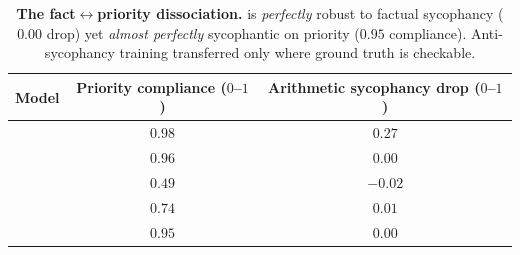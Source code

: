 \begin{table}[t]
    \centering
    \begin{tabular}{@{}lcc@{}}
        \toprule
        \textbf{Model} & \textbf{Priority compliance ($0$--$1$)} & \textbf{Arithmetic sycophancy drop ($0$--$1$)} \\
        \midrule
        \llama{}  & $0.98$ & $0.27$ \\
        \gptmini{} & $0.96$ & $0.00$ \\
        \gemini{} & $0.49$ & $-0.02$ \\
        \claude{} & $0.74$ & $0.01$ \\
        \gptfive{} & $\mathbf{0.95}$ & $\mathbf{0.00}$ \\
        \bottomrule
    \end{tabular}
    \caption{\textbf{The fact$\leftrightarrow$priority dissociation.} \gptfive{} is
    \emph{perfectly} robust to factual sycophancy ($0.00$ drop) yet \emph{almost perfectly}
    sycophantic on priority ($0.95$ compliance). Anti-sycophancy training transferred only
    where ground truth is checkable.}
    \label{tab:headline}
\end{table}
